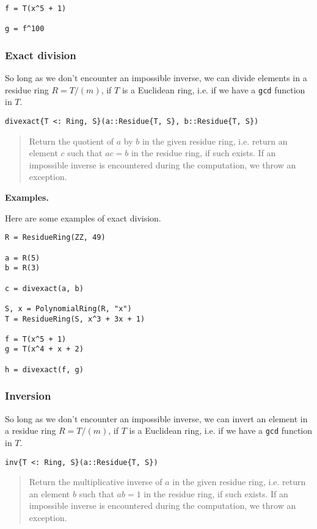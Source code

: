 \documentclass[a4paper,10pt]{article}
\newcommand{\code}{\lstinline}
\newcommand{\desc}[1]{\vspace{-3mm}\begin{quote}#1\end{quote}}
\begin{document}
{{\begin{lstlisting}
f = T(x^5 + 1)

g = f^100
\end{lstlisting}

\subsubsection{Exact division}

So long as we don't encounter an impossible inverse, we can
divide elements in a residue ring $R = T/(m)$, if $T$ is a
Euclidean ring, i.e. if we have a \code{gcd} function in $T$.

\begin{lstlisting}
divexact{T <: Ring, S}(a::Residue{T, S}, b::Residue{T, S})
\end{lstlisting}

\desc{Return the quotient of $a$ by $b$ in the given residue
ring, i.e. return an element $c$ such that $ac = b$ in the residue ring,
if such exists. If an impossible inverse is encountered during the
computation, we throw an exception.}

\textbf{Examples.}

Here are some examples of exact division.

\begin{lstlisting}
R = ResidueRing(ZZ, 49)

a = R(5)
b = R(3)

c = divexact(a, b)

S, x = PolynomialRing(R, "x")
T = ResidueRing(S, x^3 + 3x + 1)

f = T(x^5 + 1)
g = T(x^4 + x + 2)

h = divexact(f, g)
\end{lstlisting}

\subsubsection{Inversion}

So long as we don't encounter an impossible inverse, we can
invert an element in a residue ring $R = T/(m)$, if $T$ is a
Euclidean ring, i.e. if we have a \code{gcd} function in $T$.

\begin{lstlisting}
inv{T <: Ring, S}(a::Residue{T, S})
\end{lstlisting}

\desc{Return the multiplicative inverse of $a$ in the given residue
ring, i.e. return an element $b$ such that $ab = 1$ in the residue ring,
if such exists. If an impossible inverse is encountered during the
computation, we throw an exception.}

}}
\end{document}

